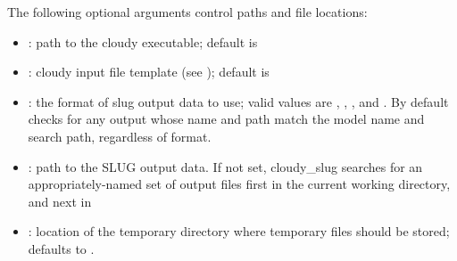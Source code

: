 \documentclass[letterpaper,10pt,english]{sphinxmanual}
\begin{document}
The following optional arguments control paths and file locations:
\begin{itemize}
\item {} 
: path to the cloudy executable; default
is 

\item {} 
: cloudy input file template (see
{\hyperref[\detokenize{cloudy:ssec-cloudy-template}]{}}); default is

\item {} 
: the format of slug output data to use;
valid values are , , , and . By
default  checks for any output whose name and path
match the model name and search path, regardless of format.

\item {} 
: path to the SLUG output data. If not set,
cloudy\_slug searches for an appropriately-named set of output files
first in the current working directory, and next in

\item {} 
: location of the temporary directory
where temporary files should be stored; defaults to
.

\end{itemize}
\end{document}
